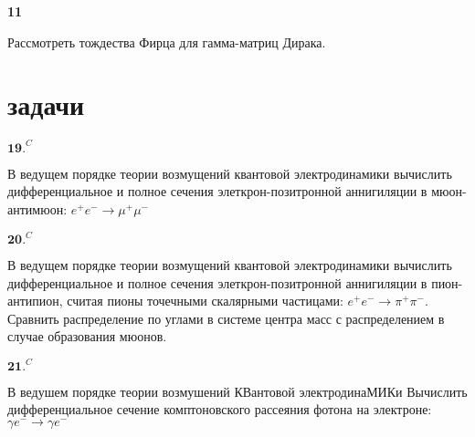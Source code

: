 \documentclass[a4paper,12pt]{article} %
\begin{document}
\begin{task}\textbf{11}

Рассмотреть тождества Фирца для гамма-матриц Дирака.









\end{task}


\section{задачи}


\begin{ttask} $\mathbf{1 9 .}^{C}$ 

В ведущем порядке теории возмущений квантовой электродинамики вычислить дифференциальное и полное сечения элеткрон-позитронной аннигиляции в мюон-антимюон: 
$e^{+} e^{-} \rightarrow \mu^{+} \mu^{-}$









\end{ttask}



\begin{ttask} $\mathbf{2 0 .}^{C}$ 
	
В ведущем порядке теории возмущений квантовой электродинамики вычислить дифференциальное и полное сечения элеткрон-позитронной аннигиляции в пион-антипион, 
считая пионы точечными скалярными частицами: $e^{+} e^{-} \rightarrow \pi^{+} \pi^{-} .$ 
Сравнить распределение по углами в системе центра масс с распределением в случае образования мюонов.














\end{ttask}



\begin{ttask} $\mathbf{2 1 .}^{C}$ 

В ведушем порядке теории возмушений КВантовой электродинаМИКи Вычислить дифференциальное сечение комптоновского рассеяния фотона на электроне: $\gamma e^{-} \rightarrow \gamma e^{-}$






\end{ttask}
\end{document}

